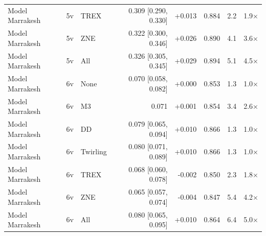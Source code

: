 \begin{table}[t]
\begin{tabular}{lllrrrrr}
Model Marrakesh & 5v & TREX & 0.309 [0.290, 0.330] & +0.013 & 0.884 & 2.2 & 1.9× \\
Model Marrakesh & 5v & ZNE & 0.322 [0.300, 0.346] & +0.026 & 0.890 & 4.1 & 3.6× \\
Model Marrakesh & 5v & All & 0.326 [0.305, 0.345] & +0.029 & 0.894 & 5.1 & 4.5× \\
Model Marrakesh & 6v & None & 0.070 [0.058, 0.082] & +0.000 & 0.853 & 1.3 & 1.0× \\
Model Marrakesh & 6v & M3 & 0.071 & +0.001 & 0.854 & 3.4 & 2.6× \\
Model Marrakesh & 6v & DD & 0.079 [0.065, 0.094] & +0.010 & 0.866 & 1.3 & 1.0× \\
Model Marrakesh & 6v & Twirling & 0.080 [0.071, 0.089] & +0.010 & 0.866 & 1.3 & 1.0× \\
Model Marrakesh & 6v & TREX & 0.068 [0.060, 0.078] & -0.002 & 0.850 & 2.3 & 1.8× \\
Model Marrakesh & 6v & ZNE & 0.065 [0.057, 0.074] & -0.004 & 0.847 & 5.4 & 4.2× \\
Model Marrakesh & 6v & All & 0.080 [0.065, 0.095] & +0.010 & 0.864 & 6.4 & 5.0× \\
\bottomrule
\end{tabular}
\end{table}
